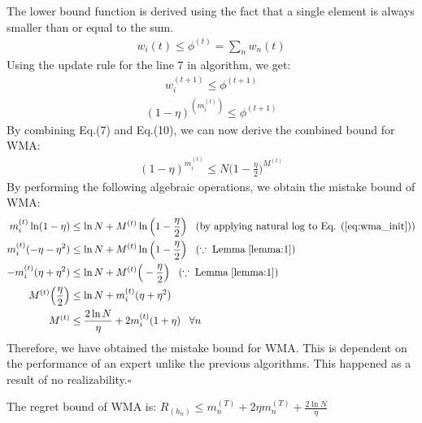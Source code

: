 \documentclass[11pt]{article}
\newcommand*{\QED}{\hfill\ensuremath{\square}}
\begin{document}
{The lower bound function is derived using the fact that a single element is always smaller than or equal to the sum.
\begin{align}
    w_i{(t)} \leq \phi^{(t)}=\sum_n w_n{(t)} \label{eq:wma_lower}
\end{align}
Using the update rule for the line 7 in algorithm, we get:
\begin{align}
    w_i^{(t+1)} \leq \phi^{(t+1)}
\end{align}
\begin{align}
    (1-\eta)^{(m_i^{(t)})} \leq \phi^{(t+1)}
\end{align}
By combining Eq.(7) and Eq.(10), we can now derive the combined bound for WMA:
\begin{align}
    (1-\eta)^{m_i^{(t)}}\leq N\Big(1-\frac{\eta}{2}\Big)^{M^{(t)}} \label{eq:wma_init}
\end{align}
By performing the following algebraic operations, we obtain the mistake bound of WMA: \begin{align*}
    m_i^{(t)}\ln(1-\eta) &\leq \ln N + M^{(t)}\ln\Big(1-\frac{\eta}{2}\Big)\;\;\;(\text{by applying natural log to Eq. (\ref{eq:wma_init})})\\
    m_i^{(t)}(-\eta-\eta^2) &\leq \ln N + M^{(t)}\ln\Big(1-\frac{\eta}{2}\Big)\;\;\;(\because\; \text{Lemma}\;\ref{lemma:1})\\
    -m_i^{(t)}(\eta+\eta^2) &\leq \ln N + M^{(t)}\Big(-\frac{\eta}{2}\Big)\;\;\;(\because\; \text{Lemma}\;\ref{lemma:1})\\
    M^{(t)}\Big(\frac{\eta}{2}\Big)&\leq\ln N + m_i^{(t)}(\eta+\eta^2)\\
    M^{(t)}&\leq\frac{2\ln N}{\eta} +  2m_i^{(t)}(1+\eta)\;\;\;\forall n
\end{align*}
Therefore, we have obtained the mistake bound for WMA. This is dependent on the performance of an expert unlike the previous algorithms. This happened as a result of no realizability.\QED}



\theorem The regret bound of WMA is:
   $ R_(h_n) \leq m_n^{(T)} + 2\eta m_n^{(T)} + \frac{2\ln N}{\eta}$
\end{document}
